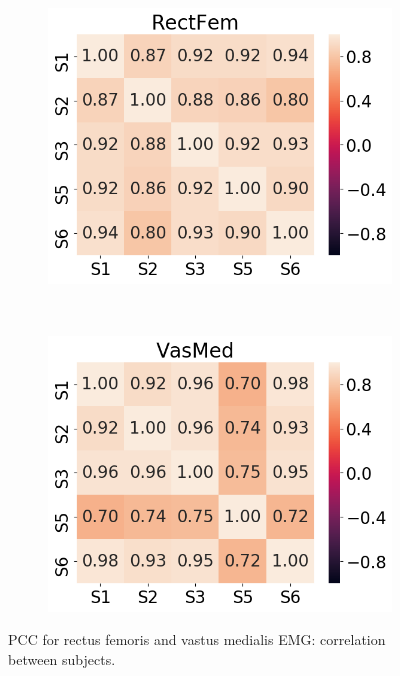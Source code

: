 \begin{figure}[!htb]
     \centering
     \begin{subfigure}[b]{0.45\textwidth}
         \centering
         \includegraphics[width=\textwidth]{img/results/correlations/RectFem_correlation_between_subjects.png}
     \end{subfigure}
     ~
     \begin{subfigure}[b]{0.45\textwidth}
         \centering
         \includegraphics[width=\textwidth]{img/results/correlations/VasMed_correlation_between_subjects.png}
     \end{subfigure}
    \caption{\ac{PCC} for rectus femoris and vastus medialis \ac{EMG}: correlation between subjects.}
    \label{fig:A-rectfem-and-vasmed-correlation}
\end{figure}
